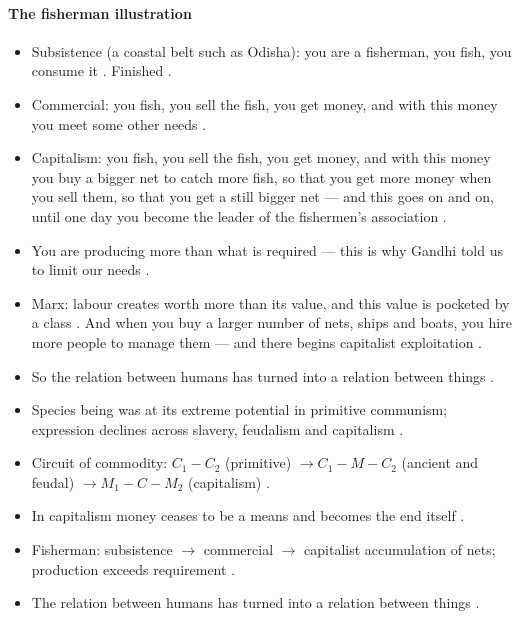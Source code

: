 \paragraph{The fisherman illustration}
\begin{itemize}
    \item Subsistence (a coastal belt such as Odisha): you are a fisherman, you fish, you consume it . Finished .
    \item Commercial: you fish, you sell the fish, you get money, and with this money you meet some other needs .
    \item Capitalism: you fish, you sell the fish, you get money, and with this money you buy a bigger net to catch more fish, so that you get more money when you sell them, so that you get a still bigger net --- and this goes on and on, until one day you become the leader of the fishermen's association .
    \item You are producing more than what is required --- this is why Gandhi told us to limit our needs .
    \item Marx: labour creates worth more than its value, and this value is pocketed by a class . And when you buy a larger number of nets, ships and boats, you hire more people to manage them --- and there begins capitalist exploitation .
    \item So the relation between humans has turned into a relation between things .
\end{itemize}

\begin{QuickRevision}
\begin{itemize}
    \item Species being was at its extreme potential in primitive communism; expression declines across slavery, feudalism and capitalism .
    \item Circuit of commodity: $C_1-C_2$ (primitive) $\rightarrow C_1-M-C_2$ (ancient and feudal) $\rightarrow M_1-C-M_2$ (capitalism) .
    \item In capitalism money ceases to be a means and becomes the end itself .
    \item Fisherman: subsistence $\rightarrow$ commercial $\rightarrow$ capitalist accumulation of nets; production exceeds requirement .
    \item The relation between humans has turned into a relation between things .
\end{itemize}
\end{QuickRevision}

